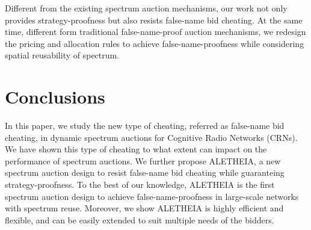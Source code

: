 \documentclass{sig-alternate}
\begin{document}
Different from the existing spectrum auction mechanisms, our work not only provides strategy-proofness but also resists false-name bid cheating. At the same time, different form traditional false-name-proof auction mechanisms, we redesign the pricing and allocation rules to achieve false-name-proofness while considering spatial reusability of spectrum.

\section{Conclusions}
In this paper, we study the new type of cheating, referred as false-name bid cheating, in dynamic spectrum auctions for Cognitive Radio Networks (CRNs). We have shown this type of cheating to what extent can impact on the performance of spectrum auctions. We further propose ALETHEIA, a new spectrum auction design to resist false-name bid cheating while guaranteing strategy-proofness. To the best of our knowledge, ALETHEIA is the first spectrum auction design to achieve false-name-proofness in large-scale networks with spectrum reuse. Moreover, we show ALETHEIA is highly efficient and flexible, and can be easily extended to suit multiple needs of the bidders.



\end{document}
